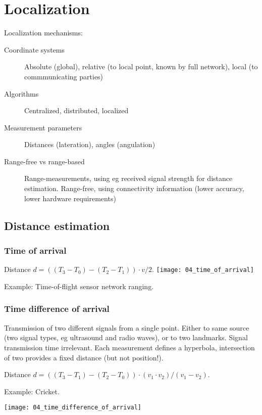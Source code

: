 \section{Localization}

Localization mechanisms:

\begin{description}
		\item[Coordinate systems] Absolute (global), relative (to local point, known by full network), local (to commmunicating parties)
		\item[Algorithms] Centralized, distributed, localized
		\item[Measurement parameters] Distances (lateration), angles (angulation)
		\item[Range-free vs range-based] Range-measurements, using eg received
				signal strength for distance estimation. Range-free, using
				connectivity information (lower accuracy, lower hardware
				requirements)
\end{description}


\subsection{Distance estimation}

\subsubsection{Time of arrival}

Distance $d = ((T_3 - T_0) - (T_2 - T_1)) \cdot v / 2$.
\texttt{[image: 04\_time\_of\_arrival]}

Example: Time-of-flight sensor network ranging.

\subsubsection{Time difference of arrival}

Transmission of two different signals from a single point. Either to same
source (two signal types, eg ultrasound and radio waves), or to two landmarks.
Signal transmission time irrelevant. Each measurement defines a hyperbola,
intersection of two provides a fixed distance (but not position!).

Distance $d = ((T_3 - T_1) - (T_2 - T_0)) \cdot (v_1 \cdot v_2) / (v_1 - v_2)$.

Example: Cricket.

\texttt{[image: 04\_time\_difference\_of\_arrival]}

